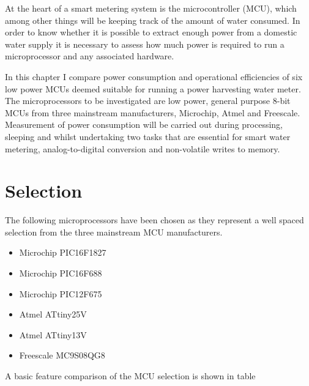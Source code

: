 
At the heart of a smart metering system is the microcontroller (MCU),
which among other things will be keeping track of the amount of water
consumed. In order to know whether it is possible to extract enough
power from a domestic water supply it is necessary to assess how much
power is required to run a microprocessor and any associated hardware.

In this chapter I compare power consumption and operational efficiencies
of six low power MCUs deemed suitable for running a power harvesting
water meter. The microprocessors to be investigated are low power,
general purpose 8-bit MCUs from three mainstream manufacturers, Microchip,
Atmel and Freescale. Measurement of power consumption will be carried
out during processing, sleeping and whilst undertaking two tasks that
are essential for smart water metering, analog-to-digital conversion
and non-volatile writes to memory.


\section{Selection}

The following microprocessors have been chosen as they represent a
well spaced selection from the three mainstream MCU manufacturers.
\begin{itemize}
\item Microchip PIC16F1827
\item Microchip PIC16F688
\item Microchip PIC12F675
\item Atmel ATtiny25V
\item Atmel ATtiny13V
\item Freescale MC9S08QG8
\end{itemize}
A basic feature comparison of the MCU selection is shown in table

